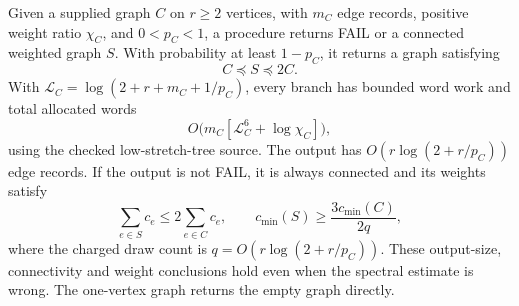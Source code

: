 \begin{theorem}
\label{thm:op3-bounded-core-sparsifier}
Given a supplied graph $C$ on $r\geq2$ vertices, with $m_C$ edge records,
positive weight ratio $\chi_C$, and $0<p_C<1$, a procedure returns
\textnormal{FAIL} or a connected weighted graph $S$. With probability
at least $1-p_C$, it returns a graph satisfying
\[
 C\preceq S\preceq2C.
\]
With $\mathcal L_C=\log(2+r+m_C+1/p_C)$, every branch has bounded
word work and total allocated words
\[
 O\bigl(m_C[\mathcal L_C^6+\log\chi_C]\bigr),
\]
using the checked low-stretch-tree source. The output has
$O(r\log(2+r/p_C))$ edge records. If the output is not
\textnormal{FAIL}, it is always connected and its weights satisfy
\[
 \sum_{e\in S}c_e\leq2\sum_{e\in C}c_e,
 \qquad c_{\min}(S)\geq\frac{3c_{\min}(C)}{2q},
\]
where the charged draw count is $q=O(r\log(2+r/p_C))$.
These output-size, connectivity and weight conclusions hold even when
the spectral estimate is wrong. The one-vertex graph returns the empty
graph directly.
\end{theorem}
